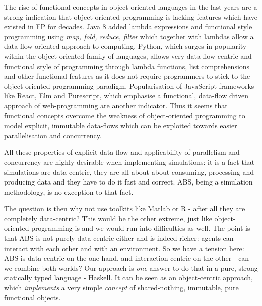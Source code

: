 The rise of functional concepts in object-oriented languages in the last years are a strong indication that object-oriented programming is lacking features which have existed in FP for decades. Java 8 added lambda expressions and functional style programming using \textit{map, fold, reduce, filter} which together with lambdas allow a data-flow oriented approach to computing. Python, which surges in popularity within the object-oriented family of languages, allows very data-flow centric and functional style of programming through lambda functions, list comprehensions and other functional features as it does not require programmers to stick to the object-oriented programming paradigm. Popularisation of JavaScript frameworks like React, Elm and Purescript, which emphasise a functional, data-flow driven approach of web-programming are another indicator. Thus it seems that functional concepts overcome the weakness of object-oriented programming to model explicit, immutable data-flows which can be exploited towards easier parallelisation and concurrency.

All these properties of explicit data-flow and applicability of parallelism and concurrency are highly desirable when implementing simulations: it is a fact that simulations are data-centric, they are all about about consuming, processing and producing data and they have to do it fast and correct. ABS, being a simulation methodology, is no exception to that fact.

The question is then why not use toolkits like Matlab or R - after all they are completely data-centric? This would be the other extreme, just like object-oriented programming is and we would run into difficulties as well. The point is that ABS is not purely data-centric either and is indeed richer: agents can interact with each other and with an environment. So we have a tension here: ABS is data-centric on the one hand, and interaction-centric on the other - can we combine both worlds? Our approach is \textit{one} answer to do that in a pure, strong statically typed language - Haskell. It can be seen as an object-centric approach, which \textit{implements} a very simple \textit{concept} of shared-nothing, immutable, pure functional objects.


